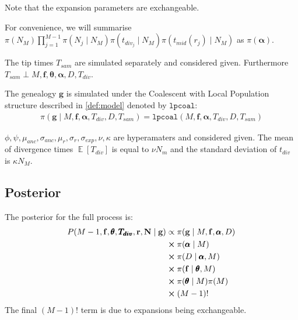 \documentclass{report}
\theoremstyle{definition}
\begin{document}
Note that the expansion parameters are exchangeable.

For convenience, we will summarise $\pi(N_M)\prod\limits_{j=1}^{M-1}\pi(N_j\mid N_{M})\pi(t_{div_j}\mid N_{M})\pi(t_{mid}(r_j)\mid N_M)$ as $\pi(\pmb\alpha)$.

The tip times $T_{sam}$ are simulated separately and considered given. Furthermore $T_{sam} \perp M, \mathbf{f}, \pmb{\theta}, \pmb\alpha, D, T_{div}$.

The genealogy $\mathbf{g}$ is simulated under the Coalescent with Local Population structure described in \ref{def:model} denoted by $\texttt{lpcoal}$:
\begin{gather}
\pi(\mathbf{g}\mid M, \mathbf{f}, \pmb\alpha, T_{div}, D, T_{sam}) = \texttt{lpcoal}(M, \mathbf{f}, \pmb\alpha, T_{div}, D, T_{sam})
\end{gather} 

$\phi, \psi, \mu_{anc}, \sigma_{anc}, \mu_r, \sigma_r, \sigma_{exp}, \nu, \kappa$ are hyperamaters and considered given. The mean of divergence times $\mathop{\mathbb{E}}[T_{div}]$ is equal to $\nu N_m$ and the standard deviation of $t_{div}$ is $\kappa N_M$.


\subsection{Posterior}
The posterior for the full process is:
\begin{gather}
\begin{aligned}
P(M-1, \mathbf{f}, \pmb{\theta}, \pmb{T_{div}}, \mathbf{r}, \mathbf{N}\mid\mathbf{g})
&\propto \pi(\mathbf{g}\mid M, \mathbf{f}, \pmb\alpha, D)\\
&\cross \pi(\pmb\alpha\mid M)\\
&\cross \pi(D\mid \pmb\alpha,M)\\
&\cross \pi(\mathbf{f}\mid\pmb{\theta}, M)\\
&\cross\pi(\pmb{\theta}\mid M)\pi(M)\\
&\cross (M-1)!
\end{aligned}
\end{gather}
The final $(M-1)!$ term is due to expansions being exchangeable.
\end{document}
